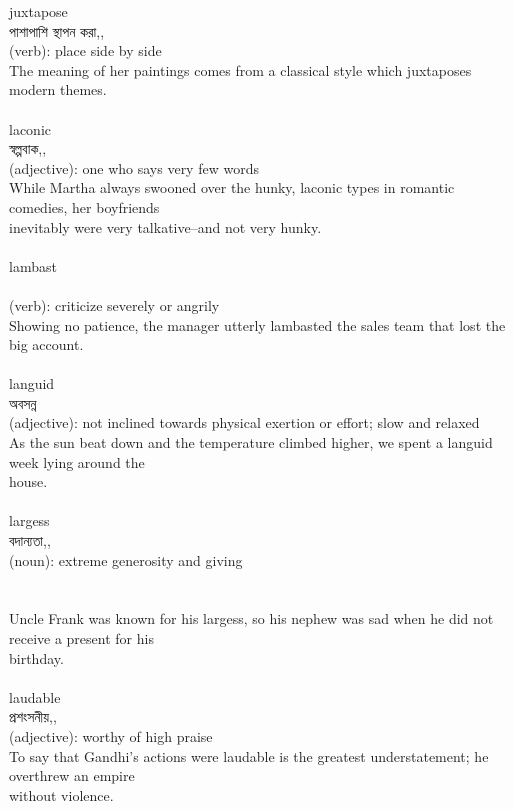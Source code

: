 \documentclass{article}
\begin{document}
{juxtapose}\\
{পাশাপাশি স্থাপন করা,,}\\
{(verb): place side by side\\The meaning of her paintings comes from a classical style which juxtaposes modern themes.\\}\\
{laconic}\\
{স্বল্পবাক,,}\\
{(adjective): one who says very few words\\While Martha always swooned over the hunky, laconic types in romantic comedies, her boyfriends\\inevitably were very talkative--and not very hunky.\\}\\
{lambast}\\
{}\\
{(verb): criticize severely or angrily\\Showing no patience, the manager utterly lambasted the sales team that lost the big account.\\}\\
{languid}\\
{অবসন্ন}\\
{(adjective): not inclined towards physical exertion or effort; slow and relaxed\\As the sun beat down and the temperature climbed higher, we spent a languid week lying around the\\house.\\}\\
{largess}\\
{বদান্যতা,,}\\
{(noun): extreme generosity and giving\\\\                                                                               \\Uncle Frank was known for his largess, so his nephew was sad when he did not receive a present for his\\birthday.\\}\\
{laudable}\\
{প্রশংসনীয়,,}\\
{(adjective): worthy of high praise\\To say that Gandhi's actions were laudable is the greatest understatement; he overthrew an empire\\without violence.\\}\\
\end{document}
